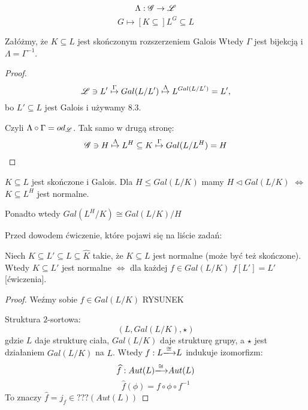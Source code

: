 $$\Lambda:\mathcal{G}\to\mathcal{L}$$
$$G\mapsto [K\subseteq]L^{G}\subseteq L$$

\begin{theorem}
Załóżmy, że $K\subseteq L$ jest skończonym rozszerzeniem Galois Wtedy $\Gamma$ jest bijekcją i $\Lambda=\Gamma^{-1}$. 
\end{theorem}

\begin{proof}
$$\mathcal{L}\ni L'\overset{\Gamma}{\mapsto}Gal(L/L')\overset{\Lambda}{\mapsto}L^{Gal(L/L')}=L',$$
bo $L'\subseteq L$ jest Galois i używamy 8.3.

Czyli $\Lambda\circ\Gamma=od_{\mathcal{L}}$. Tak samo w drugą stronę:
$$\mathcal{G}\ni H\overset{\Lambda}{\mapsto}L^H\subseteq K\overset{\Gamma}{\mapsto}Gal(L/L^H)=H$$
\end{proof}

\setcounter{theorem}{8}

\begin{conclusion}
$K\subseteq L$ jest skończone i Galois. Dla $H\leq Gal(L/K)$ mamy $H\triangleleft Gal(L/K)$ $\iff$ $K\subseteq L^H$ jest normalne.

Ponadto wtedy $Gal(L^H/K)\cong Gal(L/K)/H$
\end{conclusion}

Przed dowodem ćwiczenie, które pojawi się na liście zadań:

Niech $K\subseteq L'\subseteq L\subseteq\hat{K}$ takie, że $K\subseteq L$ jest normalne (może być też skończone). Wtedy $K\subseteq L'$ jest normalne $\iff$ dla każdej $f\in Gal(L/K)$ $f[L']=L'$ [ćwiczenia].

\begin{proof}
Weźmy sobie $f\in Gal(L/K)$
{\large\color{orange}RYSUNEK}

Struktura $2$-sortowa:
$$(L, Gal(L/K),\star)$$
gdzie $L$ daje strukturę ciała, $Gal(L/K)$ daje strukturę grupy, a $\star$ jest działaniem $Gal(L/K)$ na $L$. Wtedy $f:L\isomorphism L$ indukuje izomorfizm:
$$\hat{f}:Aut(L)\isomorphism Aut(L)$$
$$\hat{f}(\phi)=f\circ\phi\circ f^{-1}$$
To znaczy $\hat{f}=j_f\in ???(Aut(L))$
\end{proof}
